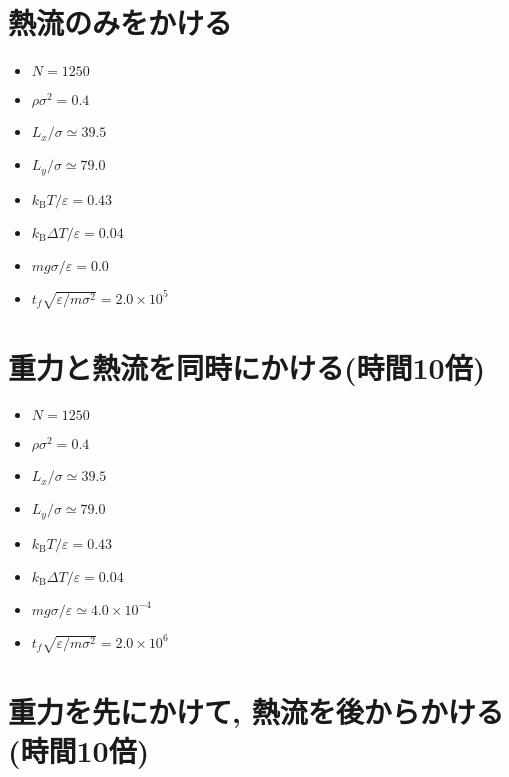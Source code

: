 

\section{熱流のみをかける}\label{sec:g0}

\begin{itemize}
  \item $N = 1250$
  \item $\rho {\sigma}^2 = 0.4$
  \item $L_x / \sigma \simeq 39.5$
  \item $L_y / \sigma \simeq 79.0$
  \item $k_{\text{B}} T / \varepsilon = 0.43$
  \item $k_{\text{B}} \Delta T / \varepsilon = 0.04$
  \item $mg\sigma/\varepsilon = 0.0$
  \item $t_f \sqrt{\varepsilon / m \sigma^2} = 2.0 \times 10^{5}$
\end{itemize}



\section{重力と熱流を同時にかける(時間10倍)}\label{sec:RaRtmap10}

\begin{itemize}
  \item $N = 1250$
  \item $\rho {\sigma}^2 = 0.4$
  \item $L_x / \sigma \simeq 39.5$
  \item $L_y / \sigma \simeq 79.0$
  \item $k_{\text{B}} T / \varepsilon = 0.43$
  \item $k_{\text{B}} \Delta T / \varepsilon = 0.04$
  \item $mg\sigma/\varepsilon \simeq 4.0 \times 10^{-4}$
  \item $t_f \sqrt{\varepsilon / m \sigma^2} = 2.0 \times 10^{6}$
\end{itemize}



\section{重力を先にかけて, 熱流を後からかける(時間10倍)}\label{sec:RaRtmap10_drop}

